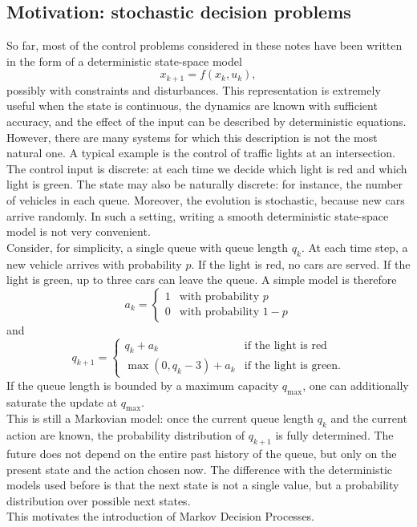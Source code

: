 \subsection{Motivation: stochastic decision problems}

So far, most of the control problems considered in these notes have been written in the form of
a deterministic state-space model
\[
x_{k+1} = f(x_k,u_k),
\]
possibly with constraints and disturbances. This representation is extremely useful when the
state is continuous, the dynamics are known with sufficient accuracy, and the effect of the input
can be described by deterministic equations.\\

However, there are many systems for which this description is not the most natural one. A
typical example is the control of traffic lights at an intersection. The control input is discrete:
at each time we decide which light is red and which light is green. The state may also be
naturally discrete: for instance, the number of vehicles in each queue. Moreover, the evolution
is stochastic, because new cars arrive randomly. In such a setting, writing a smooth deterministic
state-space model is not very convenient.\\
Consider, for simplicity, a single queue with queue length $q_k$. At each time step, a new
vehicle arrives with probability $p$. If the light is red, no cars are served. If the light is green,
up to three cars can leave the queue. A simple model is therefore
\[
a_k =
\begin{cases}
1 & \text{with probability } p\\
0 & \text{with probability } 1-p
\end{cases}
\]
and
\[
q_{k+1}
=
\begin{cases}
q_k + a_k & \text{if the light is red}\\
\max(0,q_k-3) + a_k & \text{if the light is green}.
\end{cases}
\]
If the queue length is bounded by a maximum capacity $q_{\max}$, one can additionally saturate
the update at $q_{\max}$.\\
This is still a Markovian model: once the current queue length \(q_k\) and the current action
are known, the probability distribution of \(q_{k+1}\) is fully determined. The future does not
depend on the entire past history of the queue, but only on the present state and the action
chosen now. The difference with the deterministic models used before is that the next state is
not a single value, but a probability distribution over possible next states.\\
This motivates the introduction of Markov Decision Processes.

